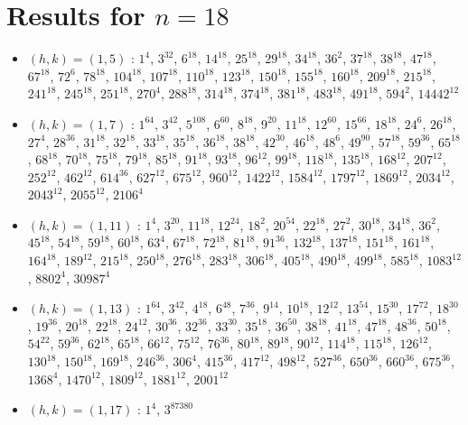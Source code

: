 \section{Results for $n=18$}
\begin{itemize}
\item $(h,k)=(1,5)$ : $1^{4}$, $3^{32}$, $6^{18}$, $14^{18}$, $25^{18}$, $29^{18}$, $34^{18}$, $36^{2}$, $37^{18}$, $38^{18}$, $47^{18}$, $67^{18}$, $72^{6}$, $78^{18}$, $104^{18}$, $107^{18}$, $110^{18}$, $123^{18}$, $150^{18}$, $155^{18}$, $160^{18}$, $209^{18}$, $215^{18}$, $241^{18}$, $245^{18}$, $251^{18}$, $270^{4}$, $288^{18}$, $314^{18}$, $374^{18}$, $381^{18}$, $483^{18}$, $491^{18}$, $594^{2}$, $14442^{12}$
\item $(h,k)=(1,7)$ : $1^{64}$, $3^{42}$, $5^{108}$, $6^{60}$, $8^{18}$, $9^{20}$, $11^{18}$, $12^{60}$, $15^{66}$, $18^{18}$, $24^{6}$, $26^{18}$, $27^{4}$, $28^{36}$, $31^{18}$, $32^{18}$, $33^{18}$, $35^{18}$, $36^{18}$, $38^{18}$, $42^{30}$, $46^{18}$, $48^{6}$, $49^{90}$, $57^{18}$, $59^{36}$, $65^{18}$, $68^{18}$, $70^{18}$, $75^{18}$, $79^{18}$, $85^{18}$, $91^{18}$, $93^{18}$, $96^{12}$, $99^{18}$, $118^{18}$, $135^{18}$, $168^{12}$, $207^{12}$, $252^{12}$, $462^{12}$, $614^{36}$, $627^{12}$, $675^{12}$, $960^{12}$, $1422^{12}$, $1584^{12}$, $1797^{12}$, $1869^{12}$, $2034^{12}$, $2043^{12}$, $2055^{12}$, $2106^{4}$
\item $(h,k)=(1,11)$ : $1^{4}$, $3^{20}$, $11^{18}$, $12^{24}$, $18^{2}$, $20^{54}$, $22^{18}$, $27^{2}$, $30^{18}$, $34^{18}$, $36^{2}$, $45^{18}$, $54^{18}$, $59^{18}$, $60^{18}$, $63^{4}$, $67^{18}$, $72^{18}$, $81^{18}$, $91^{36}$, $132^{18}$, $137^{18}$, $151^{18}$, $161^{18}$, $164^{18}$, $189^{12}$, $215^{18}$, $250^{18}$, $276^{18}$, $283^{18}$, $306^{18}$, $405^{18}$, $490^{18}$, $499^{18}$, $585^{18}$, $1083^{12}$, $8802^{4}$, $30987^{4}$
\item $(h,k)=(1,13)$ : $1^{64}$, $3^{42}$, $4^{18}$, $6^{48}$, $7^{36}$, $9^{14}$, $10^{18}$, $12^{12}$, $13^{54}$, $15^{30}$, $17^{72}$, $18^{30}$, $19^{36}$, $20^{18}$, $22^{18}$, $24^{12}$, $30^{36}$, $32^{36}$, $33^{30}$, $35^{18}$, $36^{50}$, $38^{18}$, $41^{18}$, $47^{18}$, $48^{36}$, $50^{18}$, $54^{22}$, $59^{36}$, $62^{18}$, $65^{18}$, $66^{12}$, $75^{12}$, $76^{36}$, $80^{18}$, $89^{18}$, $90^{12}$, $114^{18}$, $115^{18}$, $126^{12}$, $130^{18}$, $150^{18}$, $169^{18}$, $246^{36}$, $306^{4}$, $415^{36}$, $417^{12}$, $498^{12}$, $527^{36}$, $650^{36}$, $660^{36}$, $675^{36}$, $1368^{4}$, $1470^{12}$, $1809^{12}$, $1881^{12}$, $2001^{12}$
\item $(h,k)=(1,17)$ : $1^{4}$, $3^{87380}$

\end{itemize}
